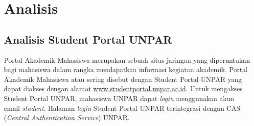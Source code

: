 \chapter{Analisis}
\label{chap:analisis}

\section{Analisis Student Portal UNPAR}
Portal Akademik Mahasiswa merupakan sebuah situs jaringan yang diperuntukan bagi mahasiswa dalam rangka mendapatkan informasi kegiatan akademik. Portal Akademik Mahasiswa atau sering disebut dengan Student Portal UNPAR yang dapat diakses dengan alamat \url{www.studentportal.unpar.ac.id}. Untuk mengakses Student Portal UNPAR, mahasiswa UNPAR dapat \textit{login} menggunakan akun email \textit{student}. Halaman \textit{login} Student Portal UNPAR terintegrasi dengan CAS (\textit{Central Authentication Service}) UNPAR.

